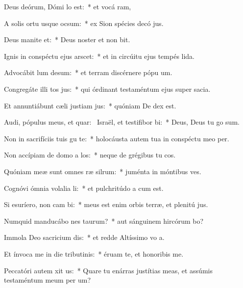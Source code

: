 \item Deus deórum, Dómi lo est:~* et vocá ram,
\item A solis ortu usque  ocsum:~* ex Sion spécies decó jus.
\item Deus manite et:~* Deus noster et non bit.
\item Ignis in conspéctu ejus arscet:~* et in circúitu ejus tempés lida.
\item Advocábit lum desum:~* et terram discérnere pópu um.
\item Congregáte illi tos jus:~* qui órdinant testaméntum ejus super sacia.
\item Et annuntiábunt cæli justiam jus:~* quóniam De dex est.
\item Audi, pópulus meus, et quar:~\pscross{} Israël, et testifibor bi:~* Deus, Deus tu go sum.
\item Non in sacrifíciis tuis gu te:~* holocáusta autem tua in conspéctu meo  per.
\item Non accípiam de domo a los:~* neque de grégibus tu cos.
\item Quóniam meæ sunt omnes ræ silrum:~* juménta in móntibus  ves.
\item Cognóvi ómnia volalia li:~* et pulchritúdo a cum est.
\item Si esuríero, non cam bi:~* meus est enim orbis terræ, et plenitú jus.
\item Numquid manducábo nes taurum?~* aut sánguinem hircórum bo?
\item Immola Deo sacricium dis:~* et redde Altíssimo vo a.
\item Et ínvoca me in die tributinis:~* éruam te, et honoribis me.
\item Peccatóri autem xit us:~* Quare tu enárras justítias meas, et assúmis testaméntum meum per  um?
